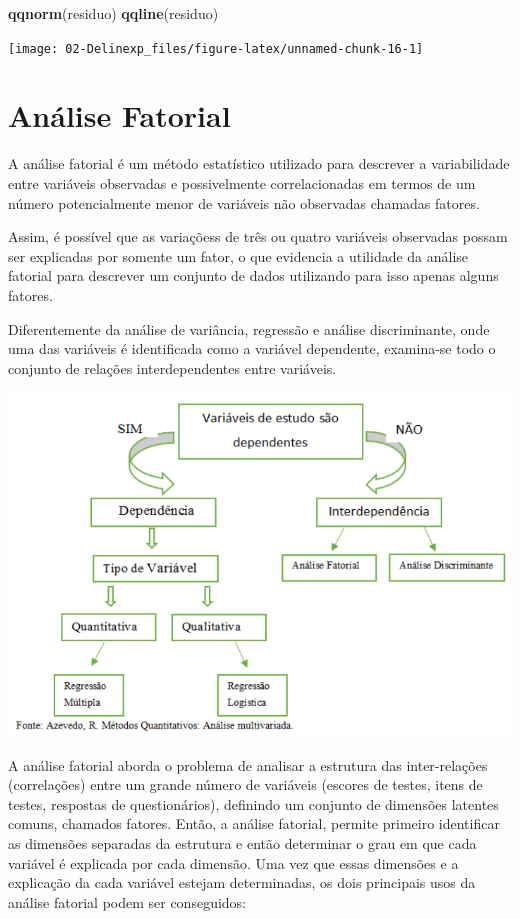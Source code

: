 \documentclass[12pt,brazil,oneside]{book}
\newenvironment{Shaded}{\begin{snugshade}}{\end{snugshade}}
\newcommand{\KeywordTok}[1]{\textcolor[rgb]{0.13,0.29,0.53}{\textbf{#1}}}
\newcommand{\NormalTok}[1]{#1}
\begin{document}
\begin{Shaded}
\begin{Highlighting}[]
\KeywordTok{qqnorm}\NormalTok{(residuo)}
\KeywordTok{qqline}\NormalTok{(residuo)}
\end{Highlighting}
\end{Shaded}

\begin{center}\texttt{[image: 02-Delinexp\_files/figure-latex/unnamed-chunk-16-1]} \end{center}

\hypertarget{analise-fatorial}{%
\chapter{Análise Fatorial}\label{analise-fatorial}}

A análise fatorial é um método estatístico utilizado para descrever a
variabilidade entre variáveis observadas e possivelmente correlacionadas
em termos de um número potencialmente menor de variáveis não observadas
chamadas fatores.

Assim, é possível que as variaçõess de três ou quatro variáveis
observadas possam ser explicadas por somente um fator, o que evidencia a
utilidade da análise fatorial para descrever um conjunto de dados
utilizando para isso apenas alguns fatores.

Diferentemente da análise de variância, regressão e análise
discriminante, onde uma das variáveis é identificada como a variável
dependente, examina-se todo o conjunto de relações interdependentes
entre variáveis.

\includegraphics{anfat1.png}

A análise fatorial aborda o problema de analisar a estrutura das
inter-relações (correlações) entre um grande número de variáveis
(escores de testes, itens de testes, respostas de questionários),
definindo um conjunto de dimensões latentes comuns, chamados fatores.
Então, a análise fatorial, permite primeiro identificar as dimensões
separadas da estrutura e então determinar o grau em que cada variável é
explicada por cada dimensão. Uma vez que essas dimensões e a explicação
da cada variável estejam determinadas, os dois principais usos da
análise fatorial podem ser conseguidos:
\end{document}

